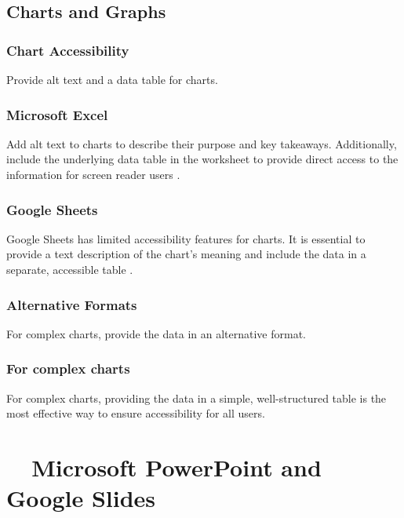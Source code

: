 \subsection{Charts and Graphs}\label{ch15:ssec:charts-graphs}

\subsubsection{Chart Accessibility}\label{ch15:sssec:chart-accessibility}
Provide alt text and a data table for charts.

\subsubsection{Microsoft Excel}\label{ch15:sssec:excel-charts}
Add alt text to charts to describe their purpose and key takeaways. Additionally, include the underlying data table in the worksheet to provide direct access to the information for screen reader users \supercite{MicrosoftAccessibility}.

\subsubsection{Google Sheets}\label{ch15:sssec:sheets-charts}
Google Sheets has limited accessibility features for charts. It is essential to provide a text description of the chart's meaning and include the data in a separate, accessible table \supercite{GoogleAccessibility}.

\subsubsection{Alternative Formats}\label{ch15:sssec:alt-formats}
For complex charts, provide the data in an alternative format.

\subsubsection{For complex charts}\label{ch15:sssec:complex-charts-alt}
For complex charts, providing the data in a simple, well-structured table is the most effective way to ensure accessibility for all users.

\section{~~Microsoft PowerPoint and Google Slides}\label{ch15:sec:ppt-slides}

